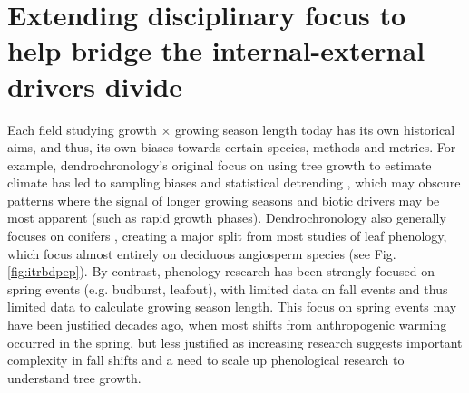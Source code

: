 \documentclass[11pt]{article}
\begin{document}
\section*{Extending disciplinary focus to help bridge the internal-external drivers divide} 


Each field studying growth $\times$ growing season length today has its own historical aims, and thus, its own biases towards certain species, methods and metrics. For example, dendrochronology's original focus on using tree growth to estimate climate has led to sampling biases \citep[e.g. to `climate-sensitive' individual trees,][]{klesse2018sampling,nehrbass2014influence} and statistical detrending \citep{rollinson2021climate}, which may obscure patterns where the signal of longer growing seasons and biotic drivers may be most apparent (such as rapid growth phases). Dendrochronology also generally focuses on conifers \citep[gymnosperms,][]{zhao2019international}, creating a major split from most studies of leaf phenology, which focus almost entirely on deciduous angiosperm species (see Fig. \ref{fig:itrbdpep}). By contrast, phenology research has been strongly focused on spring events (e.g. budburst, leafout), with limited data on fall events and thus limited data to calculate growing season length. This focus on spring events may have been justified decades ago, when most shifts from anthropogenic warming occurred in the spring, but less justified as increasing research suggests important complexity in fall shifts \citep{gill2015,zohner2023effect} and a need to scale up phenological research to understand tree growth.
\end{document}
